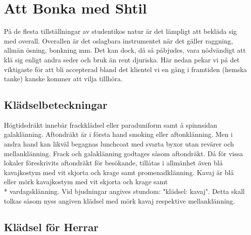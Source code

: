 \pagestyle{Att Bonka med Shtil}

\section*{\textbf{Att Bonka med Shtil}}

På de flesta tillställningar av studentikos natur är det lämpligt att bekläda sig med overall. Overallen är det oslagbara instrumentet när det gäller raggning, allmän ösning, bonkning  mm. Det kan dock, då så påbjudes, vara nödvändigt att klä sig enligt andra seder och bruk än rent djuriska. Här nedan pekar vi på det viktigaste för att bli accepterad bland det klientel vi en gång i framtiden (hemska tanke) kanske kommer att vilja tillhöra.

\subsection*{\textbf{Klädselbeteckningar}}
Högtidsdräkt innebär frackklädsel eller paraduniform samt å spinnsidan galaklänning. Aftondräkt är i första hand smoking eller aftonklänning. Men i andra hand kan likväl begagnas lunchcoat med svarta byxor utan revärer och mellanklänning. Frack och galaklänning godtages såsom aftondräkt. Då för vissa lokaler föreskrivits aftondräkt för besökande, tillåtas i allmänhet även blå kavajkostym med vit skjorta och krage samt promenadklänning. Kavaj är blå eller mörk kavajkostym med vit skjorta och krage samt\\* vardagsklänning. Vid bjudningar angives stundom: "klädsel: kavaj". Detta skall tolkas såsom nyss angiven klädsel med mörk kavaj respektive mellanklänning.

\subsection*{\textbf{Klädsel för Herrar}}
